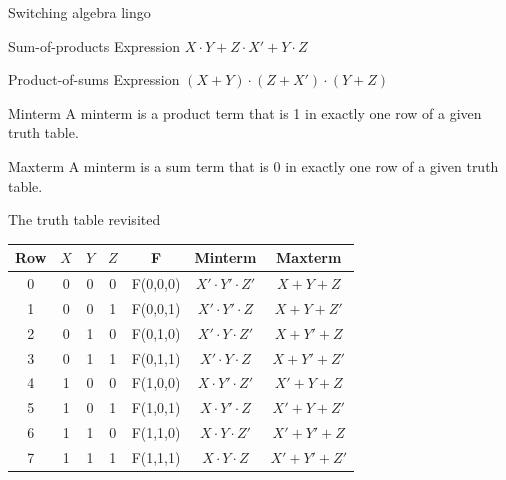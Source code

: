 \begin{frame}{Switching algebra lingo}
  \begin{block}{Sum-of-products Expression}
    $X \cdot Y + Z \cdot X' + Y \cdot Z$
  \end{block}
  \begin{block}{Product-of-sums Expression}
    $(X + Y) \cdot (Z + X') \cdot (Y + Z)$
  \end{block}
  \begin{block}{Minterm}
    A minterm is a product term that is 1 in exactly one row of a given truth table.
  \end{block}
  \begin{block}{Maxterm}
    A minterm is a sum term that is 0 in exactly one row of a given truth table.
  \end{block}
\end{frame}

\begin{frame}{The truth table revisited}
  \begin{tabular}{c|ccc|c|cc}
    \textbf{Row} & \textbf{$X$} & \textbf{$Y$} & \textbf{$Z$} & \textbf{F} & \textbf{Minterm} & \textbf{Maxterm} \\
    \hline
     0 & 0 & 0 & 0 & F(0,0,0) & $X' \cdot Y' \cdot Z'$ & $X + Y + Z$ \\
     1 & 0 & 0 & 1 & F(0,0,1) & $X' \cdot Y' \cdot Z$ & $X + Y + Z'$ \\
     2 & 0 & 1 & 0 & F(0,1,0) & $X' \cdot Y \cdot Z'$ & $X + Y' + Z$ \\
     3 & 0 & 1 & 1 & F(0,1,1) & $X' \cdot Y \cdot Z$ & $X + Y' + Z'$ \\
     4 & 1 & 0 & 0 & F(1,0,0) & $X \cdot Y' \cdot Z'$ & $X' + Y + Z$ \\
     5 & 1 & 0 & 1 & F(1,0,1) & $X \cdot Y' \cdot Z$ & $X' + Y + Z'$ \\
     6 & 1 & 1 & 0 & F(1,1,0) & $X \cdot Y \cdot Z'$ & $X' + Y' + Z$ \\
     7 & 1 & 1 & 1 & F(1,1,1) & $X \cdot Y \cdot Z$ & $X' + Y' + Z'$ \\
  \end{tabular}
\end{frame}

